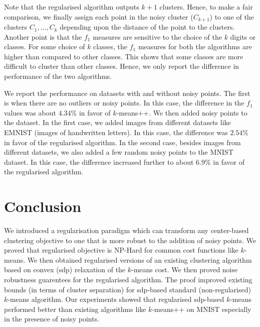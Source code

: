 \documentclass[12pt]{article}
\begin{document}
Note that the regularised algorithm outputs $k+1$ clusters. Hence, to make a fair comparison, we finally assign each point in the noisy cluster ($C_{k+1}$) to one of the clusters $C_1, \ldots, C_k$ depending upon the distance of the point to the clusters. Another point is that the $f_1$ measures are sensitive to the choice of the $k$ digits or classes. For some choice of $k$ classes, the $f_1$ measures for both the algorithms are higher than compared to other classes. This shows that some classes are more difficult to cluster than other classes. Hence, we only report the difference in performance of the two algorithms. 

We report the performance on datasets with and without noisy points. The first is when there are no outliers or noisy points. In this case, the difference in the $f_1$ values was about $4.34\%$ in favor of $k$-means++. We then added noisy points to the dataset. In the first case, we added images from different datasets like EMNIST (images of handwritten letters). In this case, the difference was $2.54\%$ in favor of the regularised algorithm. In the second case, besides images from different datasets, we also added a few random noisy points to the MNIST dataset. In this case, the difference increased further to about $6.9\%$ in favor of the regularised algorithm. 

\section{Conclusion}
We introduced a regularisation paradigm which can transform any center-based clustering objective to one that is more robust to the addition of noisy points.  We proved that regularised objective is NP-Hard for common cost functions like $k$-means. We then obtained regularised versions of an existing clustering algorithm based on convex (sdp) relaxation of the $k$-means cost. We then proved noise robustness guarentees for the regularised algorithm. The proof improved existing bounds (in terms of cluster separation) for sdp-based standard (non-regularised) $k$-means algorithm. Our experiments showed that regularised sdp-based $k$-means performed better than existing algorithms like $k$-means++ on MNIST especially in the presence of noisy points.
 

\ifdefined\COMPLETE
\else
\end{document}
